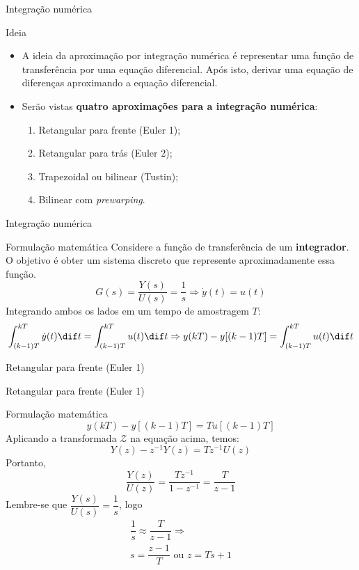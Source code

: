 \begin{frame}{Integração numérica}
\begin{block}{Ideia}
\begin{itemize}
    \item A ideia da aproximação por integração numérica é representar uma função de transferência por uma equação diferencial. Após isto, derivar uma equação de diferenças aproximando a equação diferencial.
    \item Serão vistas \textbf{quatro aproximações para a integração numérica}:
    \begin{enumerate}
        \item Retangular para frente (Euler 1);
        \item Retangular para trás (Euler 2);
        \item Trapezoidal ou bilinear (Tustin);
        \item Bilinear com \textit{prewarping}.
    \end{enumerate}
\end{itemize}
\end{block}
\end{frame}

\begin{frame}{Integração numérica}
\begin{block}{Formulação matemática}
Considere a função de transferência de um \textbf{integrador}. O objetivo é obter um sistema discreto que represente aproximadamente essa função.
\[ G(s)=\dfrac{Y(s)}{U(s)}=\dfrac{1}{s}\Rightarrow \dot{y}(t)=u(t) \]
Integrando ambos os lados em um tempo de amostragem $ T $:
\[ \int_{(k-1)T}^{kT}\dot{y}(t)\dif t=\int_{(k-1)T}^{kT}u(t)\dif t\Rightarrow y(kT)-y[(k-1)T]=\int_{(k-1)T}^{kT}u(t)\dif t \]
\end{block}
\end{frame}


\begin{frame}{Retangular para frente (Euler 1)}
\centering

\vspace{-2.5cm}

\noindent
\scalebox{1}{}
\end{frame}


\begin{frame}{Retangular para frente (Euler 1)}
\begin{block}{Formulação matemática}
	\[ y(kT)-y[(k-1)T]=T u[(k-1)T] \]
	Aplicando a transformada $ \mathcal{Z} $ na equação acima, temos:
	\[ Y(z) - z^{-1}Y(z)=Tz^{-1}U(z) \]
	Portanto,
	\[ \dfrac{Y(z)}{U(z)}=\dfrac{Tz^{-1}}{1-z^{-1}}=\dfrac{T}{z-1} \]
	Lembre-se que $ \dfrac{Y(s)}{U(s)}=\dfrac{1}{s} $, logo
	\begin{gather*}
	\dfrac{1}{s}\approx\dfrac{T}{z-1}\Rightarrow\\
	\boxed{s=\dfrac{z-1}{T}} \text{ ou } \boxed{z=Ts+1}
	\end{gather*}
\end{block}
\end{frame}


